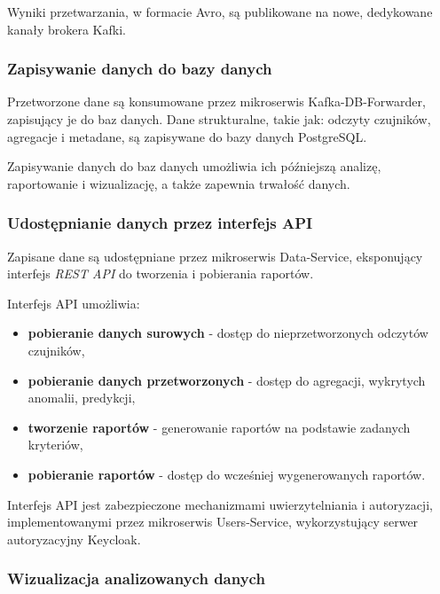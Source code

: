 \vspace{0.3em}

Wyniki przetwarzania, w formacie Avro, są publikowane na nowe, dedykowane kanały brokera Kafki.

\subsubsection{Zapisywanie danych do bazy danych}
\label{subsubsec:zapisywanie_danych}

Przetworzone dane są konsumowane przez mikroserwis Kafka-DB-Forwarder, zapisujący je do baz danych. Dane strukturalne, takie jak: odczyty czujników,
agregacje i metadane, są zapisywane do bazy danych PostgreSQL.

Zapisywanie danych do baz danych umożliwia ich późniejszą analizę, raportowanie i wizualizację, a także zapewnia trwałość danych.

\subsubsection{Udostępnianie danych przez interfejs API}
\label{subsubsec:udostepnianie_danych}

Zapisane dane są udostępniane przez mikroserwis Data-Service, eksponujący interfejs \textit{REST API} do tworzenia i pobierania raportów. 

\vspace{0.3em}

Interfejs API umożliwia:

\begin{itemize}
    \item \textbf{pobieranie danych surowych} - dostęp do nieprzetworzonych odczytów czujników,
    \item \textbf{pobieranie danych przetworzonych} - dostęp do agregacji, wykrytych anomalii, predykcji,
    \item \textbf{tworzenie raportów} - generowanie raportów na podstawie zadanych kryteriów,
    \item \textbf{pobieranie raportów} - dostęp do wcześniej wygenerowanych raportów.
\end{itemize}

\vspace{0.3em}

Interfejs API jest zabezpieczone mechanizmami uwierzytelniania i autoryzacji, implementowanymi przez mikroserwis Users-Service, wykorzystujący serwer autoryzacyjny Keycloak.

\subsubsection{Wizualizacja analizowanych danych}
\label{subsubsec:wizualizacja_danych}

